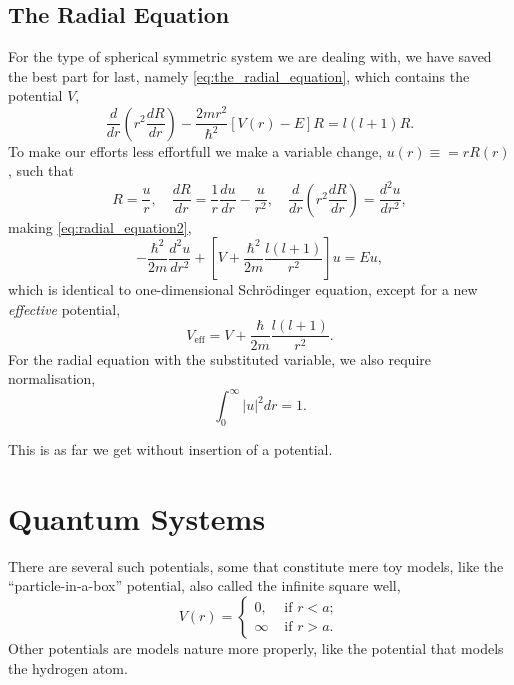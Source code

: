 \subsection{The Radial Equation}

For the type of spherical symmetric system we are dealing with, we have 
saved the best part for last, namely \autoref{eq:the_radial_equation},
which contains the potential $V$,
\begin{equation}
    \label{eq:radial_equation2}
    \frac{d}{dr}\left(r^2\frac{dR}{dr} \right)
    -
    \frac{2mr^2}{\hbar^2} [V(r) - E]R
    =
    l(l + 1)R.
\end{equation}
To make our efforts less effortfull we make a variable change, $u(r) \equiv = r R(r)$,
such that 
\begin{equation*}
    R = \frac{u}{r}, \quad
    \frac{dR}{dr} = \frac{1}{r}\frac{du}{dr} - \frac{u}{r^2}, \quad 
    \frac{d}{dr}\left(r^2 \frac{dR}{dr} \right)
        = \frac{d^2u}{dr^2},
\end{equation*}
making \autoref{eq:radial_equation2},
\begin{equation}
    - \frac{\hbar^2}{2m}\frac{d^2u}{dr^2}
    +
    \left[
        V + \frac{\hbar^2}{2m}\frac{l(l + 1)}{r^2} 
    \right]
    u = Eu,
\end{equation}
which is identical to one-dimensional Schrödinger equation, except for 
a new \emph{effective} potential,
\begin{equation}
    V_\text{eff} = V + \frac{\hbar}{2m}\frac{l(l + 1)}{r^2}.
\end{equation}
For the radial equation with the substituted variable, we also require normalisation,
\begin{equation} 
    \int_0^\infty |u|^2 dr = 1.
\end{equation}

This is as far we get without insertion of a potential. 

\section{Quantum Systems}

There are several such potentials, some that constitute mere toy models, like 
the ``particle-in-a-box'' potential, also called the infinite square well,
\begin{equation}
    V(r) = \begin{cases}
        0,      &\text{ if } r < a;\\
        \infty  &\text{ if } r > a.
    \end{cases} 
 \end{equation}
Other potentials are models nature more properly, like the potential that models
the hydrogen atom.

